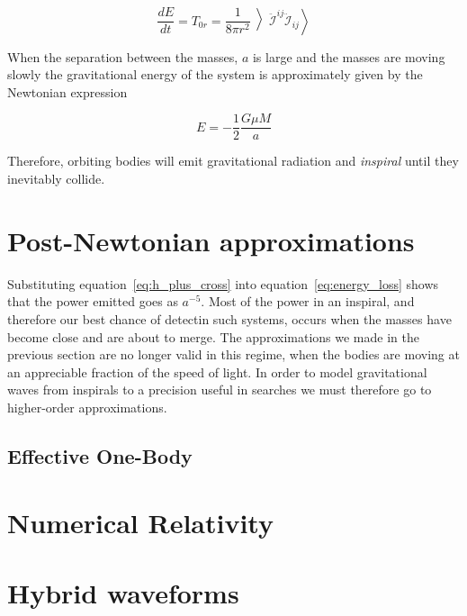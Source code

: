 \begin{equation}
\label{eq:energy_loss}
\frac{dE}{dt} = T_{0r} = \frac{1}{8 \pi r^2} \left\rangle \ddot{\mathcal{I}}^{ij}
\ddot{\mathcal{I}}_{ij} \right\rangle
\end{equation}

When the separation between the masses, $a$ is large and the masses are
moving slowly the gravitational energy of the system is approximately
given by the Newtonian expression

\begin{equation*}
E = - \frac{1}{2} \frac{G \mu M}{a}
\end{equation*}

Therefore, orbiting bodies will emit gravitational radiation and
\emph{inspiral} until they inevitably collide.

\section{Post-{N}ewtonian approximations}
\label{sec:PNWaveforms}

Substituting equation~\ref{eq:h_plus_cross} into
equation~\ref{eq:energy_loss} shows that the power emitted goes as
$a^{-5}$.  Most of the power in an inspiral, and therefore our best
chance of detectin such systems, occurs when the masses have become
close and are about to merge.  The approximations we made in the
previous section  are no longer valid in this regime, when the bodies
are moving at an appreciable fraction of the speed of light.  In order
to model gravitational waves from inspirals to a precision useful in
searches we must therefore go to higher-order approximations.

\subsection{Effective One-Body}
\label{ssec:EOB}

\section{Numerical Relativity}
\label{sec:NRWaveforms}

\section{Hybrid waveforms}
\label{sec:HybridWaveforms}


\iffalse

